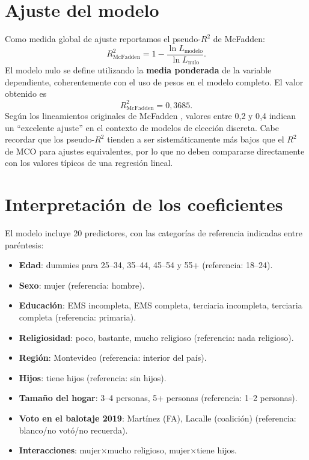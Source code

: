 \documentclass[11pt,a4paper]{article}
\begin{document}
\section{Ajuste del modelo}

Como medida global de ajuste reportamos el pseudo-$R^2$ de McFadden:
\begin{equation}
R^{2}_{\text{McFadden}} = 1 - \frac{\ln L_{\text{modelo}}}{\ln L_{\text{nulo}}}.
\end{equation}
El modelo nulo se define utilizando la \textbf{media ponderada} de la variable dependiente, coherentemente con el uso de pesos en el modelo completo. El valor obtenido es
\[
R^{2}_{\text{McFadden}} = 0{,}3685.
\]
Según los lineamientos originales de McFadden \cite{McFadden1974}, valores entre 0{,}2 y 0{,}4 indican un ``excelente ajuste'' en el contexto de modelos de elección discreta. Cabe recordar que los pseudo-$R^2$ tienden a ser sistemáticamente más bajos que el $R^2$ de MCO para ajustes equivalentes, por lo que no deben compararse directamente con los valores típicos de una regresión lineal.

\section{Interpretación de los coeficientes}
\label{sec:interpretacion}

El modelo incluye 20 predictores, con las categorías de referencia indicadas entre paréntesis:
\begin{itemize}
\setlength{\itemsep}{2pt}
\item \textbf{Edad}: dummies para 25--34, 35--44, 45--54 y 55+ (referencia: 18--24).
\item \textbf{Sexo}: mujer (referencia: hombre).
\item \textbf{Educación}: EMS incompleta, EMS completa, terciaria incompleta, terciaria completa (referencia: primaria).
\item \textbf{Religiosidad}: poco, bastante, mucho religioso (referencia: nada religioso).
\item \textbf{Región}: Montevideo (referencia: interior del país).
\item \textbf{Hijos}: tiene hijos (referencia: sin hijos).
\item \textbf{Tamaño del hogar}: 3--4 personas, 5+ personas (referencia: 1--2 personas).
\item \textbf{Voto en el balotaje 2019}: Martínez (FA), Lacalle (coalición) (referencia: blanco/no votó/no recuerda).
\item \textbf{Interacciones}: mujer$\times$mucho religioso, mujer$\times$tiene hijos.
\end{itemize}
\end{document}
